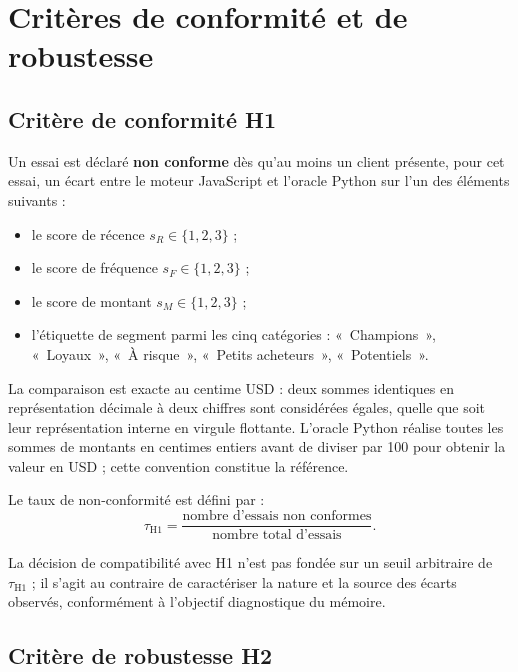 \section{Critères de conformité et de robustesse}
\label{sec:methodes-criteres}

\subsection{Critère de conformité H1}
\label{subsec:methodes-critere-h1}

Un essai est déclaré \textbf{non conforme} dès qu'au moins un client présente, pour cet
essai, un écart entre le moteur JavaScript et l'oracle Python sur l'un des éléments
suivants :

\begin{itemize}
  \item le score de récence $s_R \in \{1, 2, 3\}$ ;
  \item le score de fréquence $s_F \in \{1, 2, 3\}$ ;
  \item le score de montant $s_M \in \{1, 2, 3\}$ ;
  \item l'étiquette de segment parmi les cinq catégories : «~Champions~»,
    «~Loyaux~», «~À risque~», «~Petits acheteurs~», «~Potentiels~».
\end{itemize}

La comparaison est exacte au centime USD : deux sommes identiques en représentation
décimale à deux chiffres sont considérées égales, quelle que soit leur représentation
interne en virgule flottante. L'oracle Python réalise toutes les sommes de montants en
centimes entiers avant de diviser par 100 pour obtenir la valeur en USD ; cette convention
constitue la référence.

Le taux de non-conformité est défini par :
\[
  \tau_{\mathrm{H1}} = \frac{\text{nombre d'essais non conformes}}{\text{nombre total d'essais}}.
\]

La décision de compatibilité avec H1 n'est pas fondée sur un seuil arbitraire de
$\tau_{\mathrm{H1}}$ ; il s'agit au contraire de caractériser la nature et la source
des écarts observés, conformément à l'objectif diagnostique du mémoire.

\subsection{Critère de robustesse H2}
\label{subsec:methodes-critere-h2}

